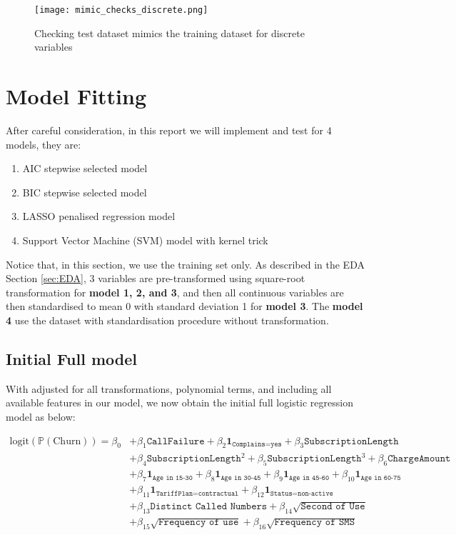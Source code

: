 \documentclass[11pt]{article}
\begin{document}
\begin{figure}[h]
    \centering
    \texttt{[image: mimic\_checks\_discrete.png]}
    \caption{Checking test dataset mimics the training dataset for discrete variables}
    \label{fig:mimcsdisc}
\end{figure}

\section{Model Fitting}\label{sec:modelling}

After careful consideration, in this report we will implement and test for 4 models, they are: 

\begin{enumerate}
    \item AIC stepwise selected model
    \item BIC stepwise selected model
    \item LASSO penalised regression model
    \item Support Vector Machine (SVM) model with kernel trick
\end{enumerate}

Notice that, in this section, we use the training set only. As described in the EDA Section \ref{sec:EDA}, 3 variables are pre-transformed using square-root transformation for \textbf{model 1, 2, and 3}, and then all continuous variables are then standardised to mean 0 with standard deviation 1 for \textbf{model 3}. The \textbf{model 4} use the dataset with standardisation procedure without transformation.  

\subsection{Initial Full model}

With adjusted for all transformations, polynomial terms, and including all available features in our model, we now obtain the initial full logistic regression model as below: 

$$
\begin{aligned}
\text{logit}(\mathbb{P}(\text{Churn})) = \beta_0 
&+ \beta_1 {\texttt{CallFailure}} 
+ \beta_2 \mathbf{1}_{\texttt{Complains=yes}} 
+ \beta_3 {\texttt{SubscriptionLength}}\\
&
+ \beta_4 {\texttt{SubscriptionLength}^2}
+ \beta_5 {\texttt{SubscriptionLength}^3} 
+ \beta_6 {\texttt{ChargeAmount}} \\
& + \beta_7 \mathbf{1}_{\texttt{Age in 15-30}} 
+ \beta_8 \mathbf{1}_{\texttt{Age in 30-45}} 
+ \beta_9 \mathbf{1}_{\texttt{Age in 45-60}} 
+ \beta_{10} \mathbf{1}_{\texttt{Age in 60-75}} \\
& + \beta_{11} \mathbf{1}_{\texttt{TariffPlan=contractual}} 
+ \beta_{12} \mathbf{1}_{\texttt{Status=non-active}} \\
&+ \beta_{13} \texttt{Distinct Called Numbers}
+ \beta_{14} \sqrt{\texttt{Second of Use}} \\
&+ \beta_{15} \sqrt{\texttt{Frequency of use}}
+ \beta_{16} \sqrt{\texttt{Frequency of SMS}}
\end{aligned}
$$
\end{document}
